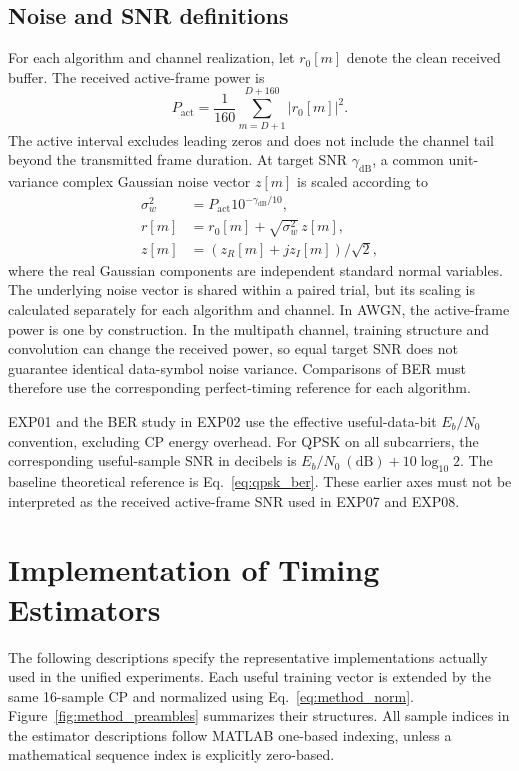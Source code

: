 \subsection{Noise and SNR definitions}
For each algorithm and channel realization, let $r_0[m]$ denote the clean received buffer. The received active-frame power is
\begin{equation}
 P_{\mathrm{act}}=\frac{1}{160}\sum_{m=D+1}^{D+160}|r_0[m]|^2.
\end{equation}
The active interval excludes leading zeros and does not include the channel tail beyond the transmitted frame duration. At target SNR $\gamma_{\mathrm{dB}}$, a common unit-variance complex Gaussian noise vector $z[m]$ is scaled according to
\begin{align}
 \sigma_w^2&=P_{\mathrm{act}}10^{-\gamma_{\mathrm{dB}}/10},\\
 r[m]&=r_0[m]+\sqrt{\sigma_w^2}\,z[m],\\
 z[m]&=(z_R[m]+jz_I[m])/\sqrt{2},
\end{align}
where the real Gaussian components are independent standard normal variables. The underlying noise vector is shared within a paired trial, but its scaling is calculated separately for each algorithm and channel. In AWGN, the active-frame power is one by construction. In the multipath channel, training structure and convolution can change the received power, so equal target SNR does not guarantee identical data-symbol noise variance. Comparisons of BER must therefore use the corresponding perfect-timing reference for each algorithm.

EXP01 and the BER study in EXP02 use the effective useful-data-bit $E_b/N_0$ convention, excluding CP energy overhead. For QPSK on all subcarriers, the corresponding useful-sample SNR in decibels is $E_b/N_0\ \mathrm{(dB)}+10\log_{10}2$. The baseline theoretical reference is Eq.~\eqref{eq:qpsk_ber}. These earlier axes must not be interpreted as the received active-frame SNR used in EXP07 and EXP08.

\section{Implementation of Timing Estimators}
\label{sec:method_estimators}
The following descriptions specify the representative implementations actually used in the unified experiments. Each useful training vector is extended by the same 16-sample CP and normalized using Eq.~\eqref{eq:method_norm}. Figure~\ref{fig:method_preambles} summarizes their structures. All sample indices in the estimator descriptions follow MATLAB one-based indexing, unless a mathematical sequence index is explicitly zero-based.

